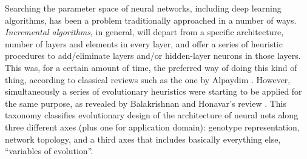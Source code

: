 \documentclass[runningheads]{llncs}
\begin{document}
Searching the parameter space of neural networks, including deep
learning algorithms, has been a problem traditionally approached
in a number of ways. {\em Incremental algorithms}, in
general, will depart from a specific architecture, number of layers
and elements in every layer, and offer a series of heuristic
procedures to add/eliminate layers and/or hidden-layer neurons in
those layers. This was, for a certain amount of time, the preferred
way of doing this kind of thing, according to classical reviews such
as the one by Alpaydim \cite{Alpaydim}. However, simultaneously a
series of evolutionary heuristics were starting to be applied for the
same purpose, as revealed by Balakrishnan and Honavar's review
\cite{balakrishnan95:EDNA}. This taxonomy classifies evolutionary
design of the architecture of neural nets along three different axes
(plus one for application domain): genotype representation, network
topology, and a third axes that includes basically everything else,
``variables of evolution''.
\end{document}
